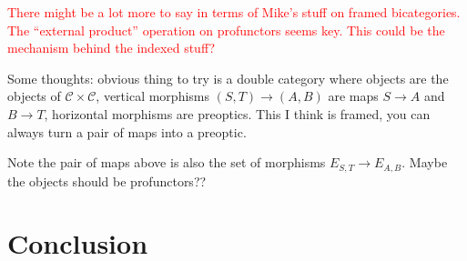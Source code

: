 \documentclass[11pt,a4paper]{article}
\theoremstyle{plain}
\theoremstyle{definition}
\newcommand{\C}{\mathscr{C}}
\newcommand{\todo}[1]{\textcolor{red}{\small #1}}
\begin{document}
\todo{There might be a lot more to say in terms of Mike's stuff on framed bicategories. The ``external product'' operation on profunctors seems key. This could be the mechanism behind the indexed stuff?}

Some thoughts: obvious thing to try is a double category where objects are the objects of $\C \times \C$, vertical morphisms $(S,T) \to (A, B)$ are maps $S \to A$ and $B \to T$, horizontal morphisms are preoptics. This I think is framed, you can always turn a pair of maps into a preoptic.

Note the pair of maps above is also the set of morphisms $E_{S, T} \to E_{A, B}$. Maybe the objects should be profunctors??



\section{Conclusion}



\end{document}
